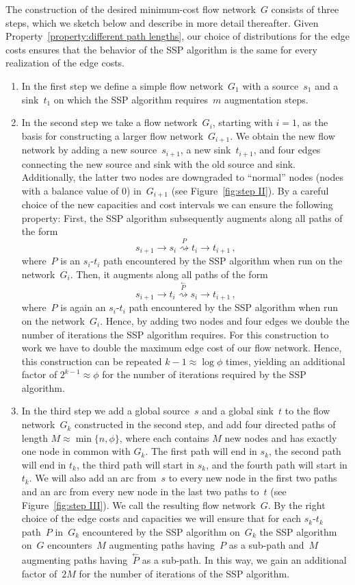 \documentclass[11pt]{article}
\newcommand{\COMMA}{\,,}
\newcommand{\sSET}[1]{\{#1\}}
\newcommand{\PATH}[1][]{\stackrel{#1}{\rightsquigarrow}}
\newcommand{\REVERSE}[1]{\stackrel{\leftarrow}{#1}}
\begin{document}
The construction of the desired minimum-cost flow network~$G$ consists of three steps,
which we sketch below and describe in more detail thereafter. Given Property~\ref{property:different path lengths}, our choice of distributions for the edge costs ensures that the behavior of the SSP algorithm is the same for every realization of the edge costs.
\begin{enumerate}
\item In the first step we define a simple flow network~$G_1$ with a source~$s_1$ and a sink~$t_1$ on which the SSP algorithm requires~$m$ augmentation steps. 

\item In the second step we take a flow network~$G_i$, starting with $i = 1$, as the basis for constructing a larger flow network~$G_{i+1}$. We obtain the new flow network by adding a new source~$s_{i+1}$, a new sink~$t_{i+1}$, and four edges connecting the new source and sink with the old source and sink. Additionally, the latter two nodes are downgraded to ``normal'' nodes (nodes with a balance value of $0$) in~$G_{i+1}$ (see Figure~\ref{fig:step II}). By a careful choice of the new capacities and cost intervals we can ensure the following property: First, the SSP algorithm subsequently augments along all paths of the form
\[
s_{i+1} \to s_i \PATH[P] t_i \to t_{i+1} \COMMA
\]
where~$P$ is an $s_i$-$t_i$ path encountered by the SSP algorithm when run on the network~$G_i$. Then, it augments along all paths of the form
\[
  s_{i+1} \to t_i \PATH[\REVERSE{P}] s_i \to t_{i+1} \COMMA
\]
where~$P$ is again an $s_i$-$t_i$ path encountered by the SSP algorithm when run on the network~$G_i$. Hence, by adding two nodes and four edges we double the number of iterations the SSP algorithm requires. For this construction to work we have to double the maximum edge cost of our flow network. Hence, this construction can be repeated $k-1 \approx \log \phi$ times, yielding an additional factor of $2^{k-1} \approx \phi$ for the number of iterations required by the SSP algorithm.

\item In the third step we add a global source~$s$ and a global sink~$t$ to the flow network~$G_k$ constructed in the second step, and add four directed paths of length $M \approx \min \sSET{ n, \phi }$, where each contains $M$ new nodes and has exactly one node in common with $G_k$.
The first path will end in $s_k$, the second path will end in $t_k$, the third path will start in $s_k$, and the fourth path will start in $t_k$. We will also add an arc from~$s$ to every new node in the first two paths and an arc from every new node in the last two paths to~$t$ (see Figure~\ref{fig:step III}). We call the resulting flow network~$G$. By the right choice of the edge costs and capacities we will ensure that for each $s_k$-$t_k$ path~$P$ in~$G_k$ encountered by the SSP algorithm on~$G_k$ the SSP algorithm on~$G$ encounters~$M$ augmenting paths having~$P$ as a sub-path and~$M$ augmenting paths having~$\REVERSE{P}$ as a sub-path. In this way, we gain an additional factor of~$2M$ for the number of iterations of the SSP algorithm.
\end{enumerate}
\end{document}
